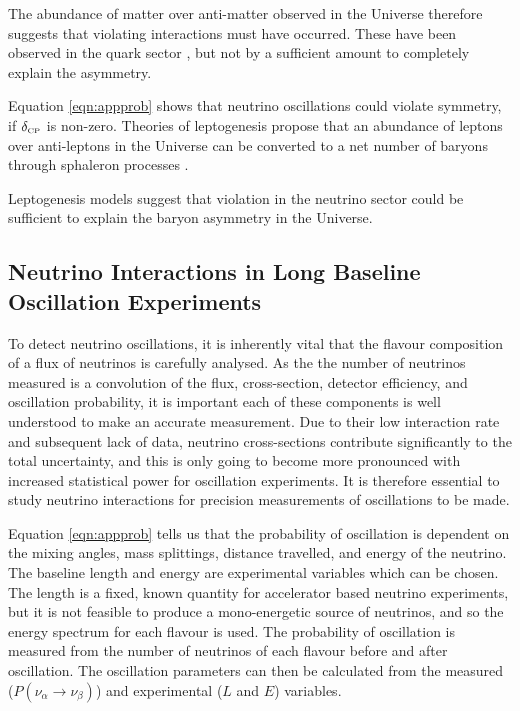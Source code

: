 The abundance of matter over anti-matter observed in the Universe therefore suggests that \CP violating interactions must have occurred. These have been observed in the quark sector \cite{quarkcpv}, but not by a sufficient amount to completely explain the asymmetry. 

Equation \ref{eqn:appprob} shows that neutrino oscillations could violate \CP symmetry, if $\delta_{\scriptscriptstyle\mathrm{CP}}$ is non-zero. Theories of leptogenesis propose that an abundance of leptons over anti-leptons in the Universe can be converted to a net number of baryons through sphaleron processes \cite{sphaleron}. 

Leptogenesis models \cite{lepto1}\cite{lepto2} suggest that \CP violation in the neutrino sector could be sufficient to explain the baryon asymmetry in the Universe.

\subsection{Neutrino Interactions in Long Baseline Oscillation Experiments}\label{sec:interactions}

To detect neutrino oscillations, it is inherently vital that the flavour composition of a flux of neutrinos is carefully analysed. As the the number of neutrinos measured is a convolution of the flux, cross-section, detector efficiency, and oscillation probability, it is important each of these components is well understood to make an accurate measurement. Due to their low interaction rate and subsequent lack of data, neutrino cross-sections contribute significantly to the total uncertainty, and this is only going to become more pronounced with increased statistical power for oscillation experiments. It is therefore essential to study neutrino interactions for precision measurements of oscillations to be made.

Equation \eqref{eqn:appprob} tells us that the probability of oscillation is dependent on the mixing angles, mass splittings, distance travelled, and energy of the neutrino. The baseline length and energy are experimental variables which can be chosen. The length is a fixed, known quantity for accelerator based neutrino experiments, but it is not feasible to produce a mono-energetic source of neutrinos, and so the energy spectrum for each flavour is used. The probability of oscillation is measured from the number of neutrinos of each flavour before and after oscillation. The oscillation parameters can then be calculated from the measured ($P(\nu_{\alpha}\rightarrow \nu_{\beta})$) and experimental ($L$ and $E$) variables.

